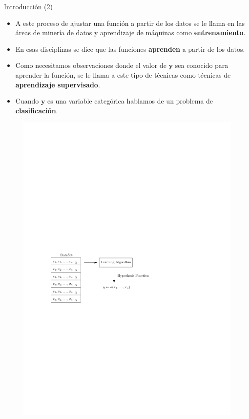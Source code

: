 \documentclass[handout]{beamer}
\begin{document}
\begin{frame}{Introducción (2)}
\scriptsize{
\begin{itemize}
 
 \item A este proceso de ajustar una función a partir de los datos se le llama en las áreas de minería de datos y aprendizaje de máquinas como \textbf{entrenamiento}.

 \item En esas disciplinas se dice que las funciones \textbf{aprenden} a partir de los datos.
 
 \item Como necesitamos observaciones donde el valor de $\mathbf{y}$ sea conocido para aprender la función,  se le llama a este tipo de técnicas como técnicas de \textbf{aprendizaje supervisado}.
 
 \item Cuando $\mathbf{y}$ es una variable categórica hablamos de un problema de \textbf{clasificación}.
 

 
\end{itemize}


\begin{figure}[h!]
	\centering
	\includegraphics[scale=0.65]{pics/learning.pdf}
\end{figure}

} 
 
\end{frame}
\end{document}
